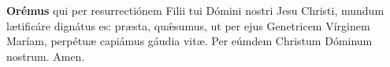 \textbf{Orémus}
qui per resurrectiónem Filii tui Dómini nostri Jesu Christi,
mundum l{\ae}tificáre dignátus es: pr{\ae}sta, qu{\'\ae}sumus, ut per ejus Genetricem Vírginem Maríam,
perpétu{\ae} capiámus gáudia vit{\ae}. Per eúmdem Christum Dóminum nostrum. Amen.